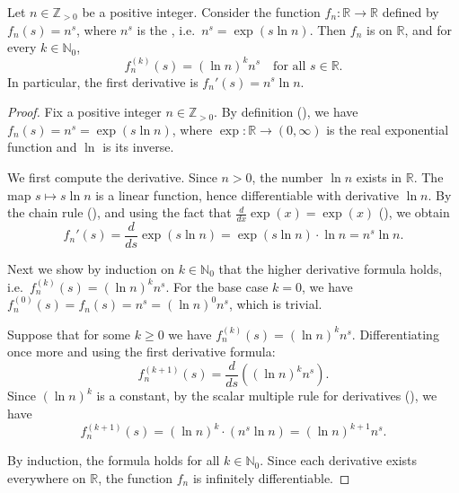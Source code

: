 \begin{proposition} \label{proposition:real_derivative_of_n_to_the_s_for_fixed_positive_integer_n}
    Let $n \in \mathbb{Z}_{>0}$ be a positive integer. Consider the function $f_n : \mathbb{R} \to \mathbb{R}$ defined by $f_n(s) = n^s$, where $n^s$ is the , i.e.\ $n^s = \exp(s \ln n)$. Then $f_n$ is  on $\mathbb{R}$, and for every $k \in \mathbb{N}_0$,
    $$f_n^{(k)}(s) = (\ln n)^k n^s \quad \text{for all } s \in \mathbb{R}.$$
    In particular, the first derivative is $f_n'(s) = n^s \ln n$.
\end{proposition}
\begin{proof}
    Fix a positive integer $n \in \mathbb{Z}_{>0}$. By definition (), we have $f_n(s) = n^s = \exp(s \ln n)$, where $\exp : \mathbb{R} \to (0,\infty)$ is the real exponential function and $\ln$ is its inverse.

    We first compute the derivative. Since $n > 0$, the number $\ln n$ exists in $\mathbb{R}$. The map $s \mapsto s \ln n$ is a linear function, hence differentiable with derivative $\ln n$. By the chain rule (), and using the fact that $\frac{d}{dx}\exp(x) = \exp(x)$ (), we obtain
    $$f_n'(s) = \frac{d}{ds} \exp(s \ln n) = \exp(s \ln n) \cdot \ln n = n^s \ln n.$$

    Next we show by induction on $k \in \mathbb{N}_0$ that the higher derivative formula holds, i.e.\ $f_n^{(k)}(s) = (\ln n)^k n^s$. For the base case $k = 0$, we have $f_n^{(0)}(s) = f_n(s) = n^s = (\ln n)^0 n^s$, which is trivial.

    Suppose that for some $k \geq 0$ we have $f_n^{(k)}(s) = (\ln n)^k n^s$. Differentiating once more and using the first derivative formula:
    $$f_n^{(k+1)}(s) = \frac{d}{ds} \left((\ln n)^k n^s\right).$$
    Since $(\ln n)^k$ is a constant, by the scalar multiple rule for derivatives (), we have
    $$f_n^{(k+1)}(s) = (\ln n)^k \cdot (n^s \ln n) = (\ln n)^{k+1} n^s.$$

    By induction, the formula holds for all $k \in \mathbb{N}_0$. Since each derivative exists everywhere on $\mathbb{R}$, the function $f_n$ is infinitely differentiable.
\end{proof}